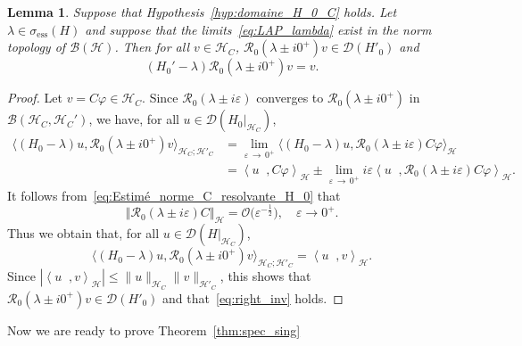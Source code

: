 \documentclass[10pt]{amsart}
\newtheorem{lemm}[theo]{Lemma}\newtheorem{prop}[theo]{Proposition}\newtheorem{coro}[theo]{Corollary}\newtheorem{conj}[theo]{Conjecture}
\theoremstyle{definition}\newtheorem{defi}[theo]{Definition}\newtheorem{rema}[theo]{Remark}\newtheorem{exam}[theo]{Example}\newtheorem{exem}[theo]{Example}\newtheorem{nota}[theo]{Notation}
\newcommand{\Hi}{\mathcal{H}}
\newcommand{\ess}{\mathrm{ess}}
\newcommand{\norme}[1]{\left\Vert #1\right\Vert}
\newcommand{\scal}[2]{\left\langle{#1} \middle., {#2}\right\rangle}
\newcommand{\Res}{\mathcal{R}}
\newcommand{\clB}{\mathcal{B}}
\newcommand{\clD}{\mathcal{D}}
\begin{document}
\begin{lemm}\label{lm:Inverse_à_droite}
Suppose that Hypothesis~\ref{hyp:domaine_H_0_C} holds. Let $\lambda\in\sigma_\ess(H)$ and suppose that the limits~\eqref{eq:LAP_lambda} exist in the norm topology of $\clB(\Hi)$. Then for all $v\in \Hi_C$, $\Res_0(\lambda\pm i0^+)v\in\clD(H'_0)$ and
\begin{equation}\label{eq:right_inv}
(H_0'-\lambda)\Res_0\left(\lambda\pm i0^+\right)v = v.
\end{equation}
\end{lemm}

\begin{proof}
Let $v=C\varphi\in\Hi_C$. Since $\Res_0(\lambda\pm i\varepsilon)$ converges to $\Res_0(\lambda\pm i0^+)$ in $\clB(\Hi_C,\Hi_C')$, we have, for all $u\in\clD(H_0|_{\Hi_C})$,
\begin{align*}
\big \langle (H_0-\lambda)u,\Res_0\left(\lambda\pm i0^+\right)v\big\rangle_{\Hi_C;\Hi'_C}&=\lim_{\varepsilon\,\rightarrow\,0^+}\big\langle(H_0-\lambda)u, \Res_0(\lambda\pm i\varepsilon)C\varphi\big\rangle_\Hi\\
&=\scal{u}{C\varphi}_{\Hi}\pm\lim_{\varepsilon\,\rightarrow\,0^+}i\varepsilon\scal{u}{\Res_0(\lambda\pm i\varepsilon)C\varphi}_\Hi.
\end{align*}
It follows from~\eqref{eq:Estimé_norme_C_resolvante_H_0} that
\begin{equation*}
\norme{\Res_0(\lambda\pm i\varepsilon)C}_\Hi=\mathcal{O}\big(\varepsilon^{-\frac12}\big), \quad \varepsilon\rightarrow 0^+.
\end{equation*}
Thus we obtain that, for all $u\in\clD(H|_{\Hi_C})$,
\begin{equation*}
\big \langle (H_0-\lambda)u,\Res_0\left(\lambda\pm i0^+\right)v\big\rangle_{\Hi_C;\Hi'_C} = \scal{u}{v}_{\Hi}.
\end{equation*}
Since $|\scal{u}{v}_{\Hi}|\le\|u\|_{\Hi_C}\|v\|_{\Hi'_C}$, this shows that $\Res_0(\lambda\pm i0^+)v\in\clD(H'_0)$ and that~\eqref{eq:right_inv} holds.
\end{proof}

Now we are ready to prove Theorem~\ref{thm:spec_sing}
\end{document}
